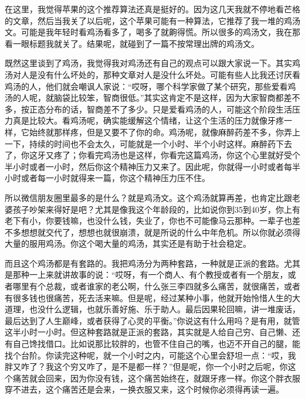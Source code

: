 \documentclass[
  letterpaper,
  DIV=11,
  numbers=noendperiod]{scrreprt}
\begin{document}
在这里，我觉得苹果的这个推荐算法还真是挺好的。因为这几天我就不停地看芒格的文章，然后当我关了以后呢，这个苹果可能有一种算法，它推荐了我一堆的鸡汤文。可能是我年轻时看鸡汤看多了，喝多了就齁得慌。所以很多的鸡汤文，我在那看一眼标题我就关了。结果呢，就碰到了一篇不按常理出牌的鸡汤文。

既然这里谈到了鸡汤，我觉得我对鸡汤还有自己的观点可以跟大家说一下。其实鸡汤对人是没有什么坏处的，那种文章对人是没什么坏处。可能有些人比我还讨厌看鸡汤的人，他们就会嘲讽人家说：``哎呀，哪个科学家做了某个研究，那些爱看鸡汤的人呢，就脑袋比较笨，智商很低。''其实这肯定不是这样，因为大家智商都差不多，按正态分布的话，智商差不了多少。只是爱看鸡汤的人，可能这个阶段生活压力真是比较大。看鸡汤呢，确实能缓解这个情绪，让这个生活的压力就像牙疼一样，它始终就那样疼，但是又要不了你的命。鸡汤呢，就像麻醉药差不多，你弄上一下，持续的时间也不会太久，可能就是一个小时、半个小时这样。麻醉药下去了，你这牙又疼了；你看完鸡汤也是这样，你看完这篇鸡汤，你这个心里就好受个半小时或者一小时，然后你这个精神压力又来了。因此呢，你就得一小时或者每半小时或者每一小时就得来一篇，你这个精神压力压不住。

所以微信朋友圈里最多的是什么？就是鸡汤文。这个鸡汤就算再差，也肯定比跟老婆孩子吵架来得好是吧？尤其是像我这个年龄段的，比如说你到35到40岁，你上有老下有小，你要钱嘛，也没什么钱，失业了，你也不可能像马云那种。一辈子也差不多想想就交代了，想想也就很崩溃，就是所说的什么中年危机。所以你就必须得大量的服用鸡汤。你这个喝大量的鸡汤，其实还是有助于社会稳定。

而且这个鸡汤都是有套路的。我把鸡汤分为两种套路，一种就是正派的套路。尤其是那种一上来就讲故事的说：``哎呀，有一个商人、有个教授或者有一个朋友，或者哪里有个总裁，或者谁家的老公啊，什么张三李四就多么痛苦，就很痛苦，或者有很多钱也很痛苦，死去活来嘛。但是呢，经过某种小事，他就开始怜惜人生的大道理，也没什么逻辑，也就乐善好施、乐于助人。最后因果轮回嘛，讲一堆废话，最后达到了人生巅峰，或者获得了心灵的平衡。''你说这有什么用吗？是有用，就管这半小时一小时。但这种套路就是正派的套路，其实就是人给自己穷、自己懒、还有自己馋找借口。比如说那比较胖的，也管不住自己的嘴，也迈不开自己的腿，能找个台阶。你读完这种呢，就一个小时之内，可能这个心里会舒坦一点：``哎，我胖又咋了？我这个穷又咋了，是不是都一样？''但是呢，你一个小时之后呢，你这个痛苦就会回来，因为你没有钱，这个痛苦始终在，就跟牙疼一样。你这个胖衣服穿不进去，这个痛苦还是会来，一换衣服又来，这个时候你必须得再读一遍。
\end{document}
